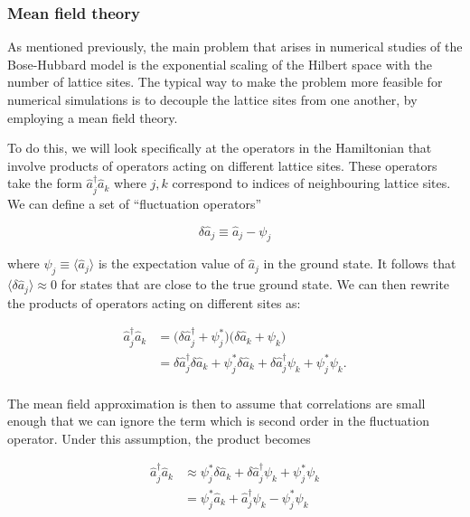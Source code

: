 \documentclass[11pt]{article}
\begin{document}
    \hypertarget{mean-field-theory}{%
\subsubsection{Mean field theory}\label{mean-field-theory}}

    As mentioned previously, the main problem that arises in numerical
studies of the Bose-Hubbard model is the exponential scaling of the
Hilbert space with the number of lattice sites. The typical way to make
the problem more feasible for numerical simulations is to decouple the
lattice sites from one another, by employing a mean field theory.

To do this, we will look specifically at the operators in the
Hamiltonian that involve products of operators acting on different
lattice sites. These operators take the form
\(\hat a_{j}^\dagger \hat a_{k}\) where \(j,k\) correspond to indices of
neighbouring lattice sites. We can define a set of ``fluctuation
operators''

\begin{equation}
\delta \hat a_{j} \equiv \hat a_{j} - \psi_j
\end{equation}

where \(\psi_j \equiv \langle \hat a_{j} \rangle\) is the expectation
value of \(\hat a_j\) in the ground state. It follows that
\(\langle \delta \hat a_j \rangle \approx 0\) for states that are close
to the true ground state. We can then rewrite the products of operators
acting on different sites as:

\begin{align*}
\hat a_{j}^\dagger \hat a_{k} &= \Big( \delta \hat a_{j }^\dagger +\psi_j^* \Big)  \Big( \delta \hat a_{k } +\psi_k \Big)  \\
&= \delta \hat a_{j}^\dagger \delta \hat a_{k} +  \psi_j^*  \delta \hat a_{k } + \delta \hat a_{j}^\dagger \psi_k + \psi_{j}^* \psi_k . \\
\end{align*}

The mean field approximation is then to assume that correlations are
small enough that we can ignore the term which is second order in the
fluctuation operator. Under this assumption, the product becomes

\begin{align*} 
\hat a_{j}^\dagger \hat a_{k} &\approx \psi_j^*  \delta \hat a_{k } + \delta \hat a_{j}^\dagger \psi_k + \psi_{j}^* \psi_k \\
&=   \psi_j^*  \hat a_{k } +\hat a_{j}^\dagger \psi_k - \psi_{j}^* \psi_k 
\end{align*}
\end{document}
